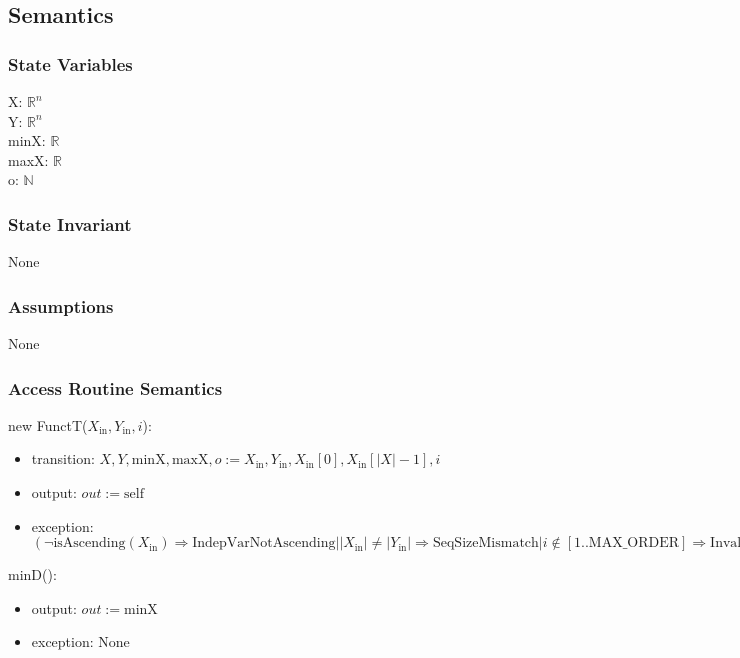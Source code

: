 \documentclass[12pt, titlepage]{article}
\begin{document}
\subsection {Semantics}

\subsubsection {State Variables}

X: $\mathbb{R}^n$\\
Y: $\mathbb{R}^n$\\
minX: $\mathbb{R}$\\
maxX: $\mathbb{R}$\\
o: $\mathbb{N}$

\subsubsection {State Invariant}

None

\subsubsection {Assumptions}

None

\subsubsection {Access Routine Semantics}

\noindent new FunctT($X_\text{in}, Y_\text{in}, i$):
\begin{itemize}
\item transition: $X, Y, \mbox{minX}, \mbox{maxX}, o := X_\text{in}, Y_\text{in}, X_\text{in}[0], X_\text{in}[|X|-1], i$

\item output: $out := \mbox{self}$
\item exception: $(\neg \mbox{isAscending}(X_\text{in}) \Rightarrow
  \mbox{IndepVarNotAscending} | |X_\text{in}| \neq |Y_\text{in}| \Rightarrow \mbox{SeqSizeMismatch}
  | i \notin [1..\mbox{MAX\_ORDER}] \Rightarrow \mbox{InvalidInterpOrder} |
  |X_\text{in}| < 3 \Rightarrow \mbox{TooFewDataPts})$
\end{itemize}

\noindent minD():
\begin{itemize}
\item output: $out := \mbox{minX}$
\item exception: None
\end{itemize}
\end{document}
